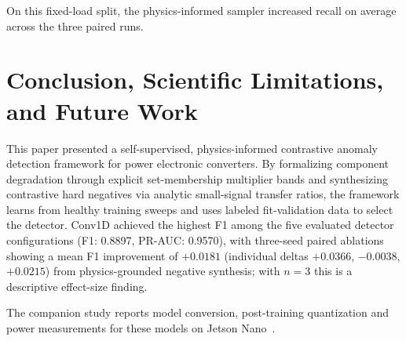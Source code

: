 \documentclass[11pt,a4paper]{article}
\begin{document}
On this fixed-load split, the physics-informed sampler increased recall on average across the three paired runs.

\section{Conclusion, Scientific Limitations, and Future Work}
\label{sec:conclusion}

This paper presented a self-supervised, physics-informed contrastive anomaly detection framework for power electronic converters. By formalizing component degradation through explicit set-membership multiplier bands and synthesizing contrastive hard negatives via analytic small-signal transfer ratios, the framework learns from healthy training sweeps and uses labeled fit-validation data to select the detector. Conv1D achieved the highest F1 among the five evaluated detector configurations (F1: 0.8897, PR-AUC: 0.9570), with three-seed paired ablations showing a mean F1 improvement of $+0.0181$ (individual deltas $+0.0366$, $-0.0038$, $+0.0215$) from physics-grounded negative synthesis; with $n=3$ this is a descriptive effect-size finding.

The companion study reports model conversion, post-training quantization and power measurements for these models on Jetson Nano~\cite{jsc_edge_deployment}.
\end{document}
